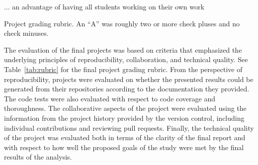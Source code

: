 ... an advantage of having all students working on their own work

\begin{table}
\centering
\begin{tiny}

\caption{Project grading rubric.
An ``A'' was roughly two or more check pluses and no check minuses.}
\label{tab:rubric}
\end{tiny}
\end{table}

The evaluation of the final projects was based on criteria that emphasized the
underlying principles of reproducibility, collaboration, and technical
quality.
See Table~\ref{tab:rubric} for the final project grading rubric.
From the perspective of reproducibility, projects were evaluated on whether the
presented results could be generated from their repositories according to the
documentation they provided.
The code tests were also evaluated with respect to code coverage
and thoroughness.
The collaborative aspects of the project were evaluated using the information
from the project history provided by the version control, including
individual contributions and reviewing pull requests.
Finally, the technical quality of the project was evaluated both in terms of
the clarity of the final report and with respect to how well the proposed
goals of the study were met by the final results of the analysis.

